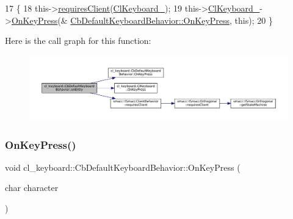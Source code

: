 \begin{DoxyCode}
17     \{
18         this->\hyperlink{classsmacc_1_1ISmaccClientBehavior_a32b16e99e3b4cb289414203dc861a440}{requiresClient}(\hyperlink{classcl__keyboard_1_1CbDefaultKeyboardBehavior_a482e94248b8e6fbac0973d3dec0cc20b}{ClKeyboard\_});
19         this->\hyperlink{classcl__keyboard_1_1CbDefaultKeyboardBehavior_a482e94248b8e6fbac0973d3dec0cc20b}{ClKeyboard\_}->\hyperlink{classcl__keyboard_1_1ClKeyboard_ae9f4a6dc1ce18397394a432826970baa}{OnKeyPress}(&
      \hyperlink{classcl__keyboard_1_1CbDefaultKeyboardBehavior_aa834f8e626a306920e536e7535041ac3}{CbDefaultKeyboardBehavior::OnKeyPress}, \textcolor{keyword}{this});
20     \}
\end{DoxyCode}
Here is the call graph for this function\+:
\nopagebreak
\begin{figure}[H]
\begin{center}
\leavevmode
\includegraphics[width=350pt]{classcl__keyboard_1_1CbDefaultKeyboardBehavior_a06e49d8c78aeffecf74c27b05f529a3a_cgraph}
\end{center}
\end{figure}
\mbox{\label{classcl__keyboard_1_1CbDefaultKeyboardBehavior_aa834f8e626a306920e536e7535041ac3}} 
\subsubsection{\texorpdfstring{On\+Key\+Press()}{OnKeyPress()}}
{\footnotesize\ttfamily void cl\+\_\+keyboard\+::\+Cb\+Default\+Keyboard\+Behavior\+::\+On\+Key\+Press (\begin{DoxyParamCaption}\item[{char}]{character }\end{DoxyParamCaption})\hspace{0.3cm}{\ttfamily [inline]}}



